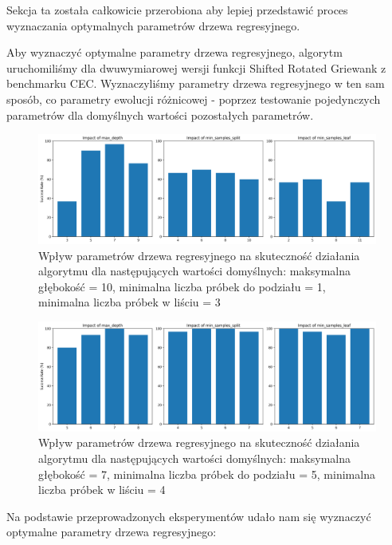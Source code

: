\documentclass{article}
\begin{document}
Sekcja ta została całkowicie przerobiona aby lepiej przedstawić proces wyznaczania optymalnych parametrów drzewa regresyjnego.

Aby wyznaczyć optymalne parametry drzewa regresyjnego, algorytm uruchomiliśmy dla dwuwymiarowej wersji funkcji Shifted Rotated Griewank z benchmarku CEC. Wyznaczyliśmy parametry drzewa regresyjnego w ten sam sposób, co parametry ewolucji różnicowej - poprzez testowanie pojedynczych parametrów dla domyślnych wartości pozostałych parametrów.

\begin{figure}[H]
    \centering
    \includegraphics[width=\textwidth]{tree_parameter_tuning_separate_results2.png}
    \caption{Wpływ parametrów drzewa regresyjnego na skuteczność działania algorytmu dla następujących wartości domyślnych: maksymalna głębokość = 10, minimalna liczba próbek do podziału = 1, minimalna liczba próbek w liściu = 3}
    \label{fig:tree_parameter_results1}
\end{figure}

\begin{figure}[H]
    \centering
    \includegraphics[width=\textwidth]{tree_parameter_tuning_separate_results3.png}
    \caption{Wpływ parametrów drzewa regresyjnego na skuteczność działania algorytmu dla następujących wartości domyślnych: maksymalna głębokość = 7, minimalna liczba próbek do podziału = 5, minimalna liczba próbek w liściu = 4}
    \label{fig:tree_parameter_results2}
\end{figure}

Na podstawie przeprowadzonych eksperymentów udało nam się wyznaczyć optymalne parametry drzewa regresyjnego:
\end{document}
